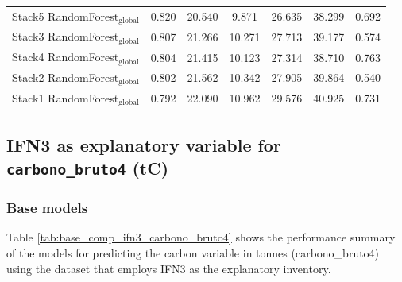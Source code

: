 \begin{table}[tp]
{\begin{tabular}{p{4.5cm}cccccc}
        Stack5 RandomForest$_{\text{global}}$ & 0.820 & 20.540 & 9.871 & 26.635 & 38.299 & 0.692 \\
        Stack3 RandomForest$_{\text{global}}$ & 0.807 & 21.266 & 10.271 & 27.713 & 39.177 & 0.574 \\
        Stack4 RandomForest$_{\text{global}}$ & 0.804 & 21.415 & 10.123 & 27.314 & 38.710 & 0.763 \\
        Stack2 RandomForest$_{\text{global}}$ & 0.802 & 21.562 & 10.342 & 27.905 & 39.864 & 0.540 \\
        Stack1 RandomForest$_{\text{global}}$ & 0.792 & 22.090 & 10.962 & 29.576 & 40.925 & 0.731 \\
            \bottomrule
    \end{tabular}
    }
\end{table}


\clearpage
\subsection{IFN3 as explanatory variable for \texttt{carbono\_bruto4} (tC)}

\subsubsection{Base models}

Table \ref{tab:base_comp_ifn3_carbono_bruto4} shows the performance summary of the models for predicting the carbon variable in tonnes (carbono\_bruto4) using the dataset that employs IFN3 as the explanatory inventory.

